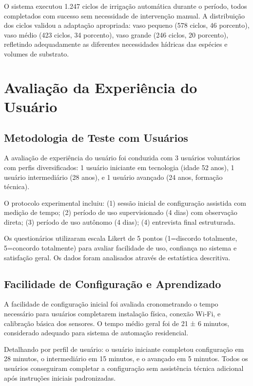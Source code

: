 O sistema executou 1.247 ciclos de irrigação automática durante o período, todos completados com sucesso sem necessidade de intervenção manual. A distribuição dos ciclos validou a adaptação apropriada: vaso pequeno (578 ciclos, 46 porcento), vaso médio (423 ciclos, 34 porcento), vaso grande (246 ciclos, 20 porcento), refletindo adequadamente as diferentes necessidades hídricas das espécies e volumes de substrato.

\section{Avaliação da Experiência do Usuário}

\subsection{Metodologia de Teste com Usuários}

A avaliação de experiência do usuário foi conduzida com 3 usuários voluntários com perfis diversificados: 1 usuário iniciante em tecnologia (idade 52 anos), 1 usuário intermediário (28 anos), e 1 usuário avançado (24 anos, formação técnica).

O protocolo experimental incluiu: (1) sessão inicial de configuração assistida com medição de tempo; (2) período de uso supervisionado (4 dias) com observação direta; (3) período de uso autônomo (4 dias); (4) entrevista final estruturada.

Os questionários utilizaram escala Likert de 5 pontos (1=discordo totalmente, 5=concordo totalmente) para avaliar facilidade de uso, confiança no sistema e satisfação geral. Os dados foram analisados através de estatística descritiva.

\subsection{Facilidade de Configuração e Aprendizado}

A facilidade de configuração inicial foi avaliada cronometrando o tempo necessário para usuários completarem instalação física, conexão Wi-Fi, e calibração básica dos sensores. O tempo médio geral foi de 21 ± 6 minutos, considerado adequado para sistema de automação residencial.

Detalhando por perfil de usuário: o usuário iniciante completou configuração em 28 minutos, o intermediário em 15 minutos, e o avançado em 5 minutos. Todos os usuários conseguiram completar a configuração sem assistência técnica adicional após instruções iniciais padronizadas.

